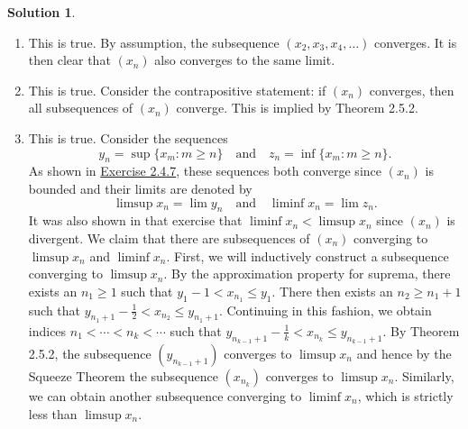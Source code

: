 \documentclass[12pt]{article}
\theoremstyle{definition}
\theoremstyle{exercise}
\theoremstyle{solution}
\newtheorem*{solution}{Solution}
\begin{document}
\begin{solution}
    \begin{enumerate}
        \item This is true. By assumption, the subsequence \( (x_2, x_3, x_4, \ldots) \) converges. It is then clear that \( (x_n) \) also converges to the same limit.

        \item This is true. Consider the contrapositive statement: if \( (x_n) \) converges, then all subsequences of \( (x_n) \) converge. This is implied by Theorem 2.5.2.

        \item This is true. Consider the sequences
        \[
            y_n = \sup \{ x_m : m \geq n \} \quad \text{and} \quad z_n = \inf \{ x_m : m \geq n \}.
        \]
        As shown in \href{https://lew98.github.io/Mathematics/UA_Section_2_4_Exercises.pdf}{Exercise 2.4.7}, these sequences both converge since \( (x_n) \) is bounded and their limits are denoted by
        \[
            \limsup x_n = \lim y_n \quad \text{and} \quad \liminf x_n = \lim z_n.
        \]
        It was also shown in that exercise that \( \liminf x_n < \limsup x_n \) since \( (x_n) \) is divergent. We claim that there are subsequences of \( (x_n) \) converging to \( \limsup x_n \) and \( \liminf x_n \). First, we will inductively construct a subsequence converging to \( \limsup x_n \). By the approximation property for suprema, there exists an \( n_1 \geq 1 \) such that \( y_1 - 1 < x_{n_1} \leq y_1 \). There then exists an \( n_2 \geq n_1 + 1 \) such that \( y_{n_1 + 1} - \tfrac{1}{2} < x_{n_2} \leq y_{n_1 + 1} \). Continuing in this fashion, we obtain indices \( n_1 < \cdots < n_k < \cdots \) such that \( y_{n_{k-1} + 1} - \tfrac{1}{k} < x_{n_k} \leq y_{n_{k-1} + 1} \). By Theorem 2.5.2, the subsequence \( (y_{n_{k-1} + 1}) \) converges to \( \limsup x_n \) and hence by the Squeeze Theorem the subsequence \( (x_{n_k}) \) converges to \( \limsup x_n \). Similarly, we can obtain another subsequence converging to \( \liminf x_n \), which is strictly less than \( \limsup x_n \).


\end{enumerate}
\end{solution}
\end{document}
